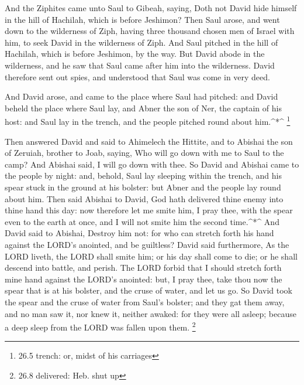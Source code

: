  And the Ziphites came unto Saul to Gibeah, saying, Doth not
David hide himself in the hill of Hachilah, which is before Jeshimon?
 Then Saul arose, and went down to the wilderness of Ziph,
having three thousand chosen men of Israel with him, to seek David in
the wilderness of Ziph.  And Saul pitched in the hill of
Hachilah, which is before Jeshimon, by the way. But David abode in the
wilderness, and he saw that Saul came after him into the wilderness.
 David therefore sent out spies, and understood that Saul
was come in very deed.

 And David arose, and came to the place where Saul had
pitched: and David beheld the place where Saul lay, and Abner the son of
Ner, the captain of his host: and Saul lay in the trench, and the people
pitched round about him.\^{}*\^{} \footnote{26.5 trench: or, midst of
  his carriages}

 Then answered David and said to Ahimelech the Hittite, and
to Abishai the son of Zeruiah, brother to Joab, saying, Who will go down
with me to Saul to the camp? And Abishai said, I will go down with thee.
 So David and Abishai came to the people by night: and,
behold, Saul lay sleeping within the trench, and his spear stuck in the
ground at his bolster: but Abner and the people lay round about him.
 Then said Abishai to David, God hath delivered thine enemy
into thine hand this day: now therefore let me smite him, I pray thee,
with the spear even to the earth at once, and I will not smite him the
second time.\^{}*\^{}  And David said to Abishai, Destroy
him not: for who can stretch forth his hand against the LORD's anointed,
and be guiltless?  David said furthermore, As the LORD
liveth, the LORD shall smite him; or his day shall come to die; or he
shall descend into battle, and perish.  The LORD forbid
that I should stretch forth mine hand against the LORD's anointed: but,
I pray thee, take thou now the spear that is at his bolster, and the
cruse of water, and let us go.  So David took the spear and
the cruse of water from Saul's bolster; and they gat them away, and no
man saw it, nor knew it, neither awaked: for they were all asleep;
because a deep sleep from the LORD was fallen upon them. \footnote{26.8
  delivered: Heb. shut up}

